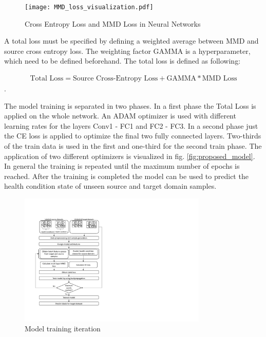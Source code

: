 \begin{figure}[H]
  \centering
  \texttt{[image: MMD\_loss\_visualization.pdf]}
  \caption {Cross Entropy Loss and MMD Loss in Neural Networks} \label{fig:MMD_Loss_and_CE_loss}
\end{figure}
 
A total loss must be specified by defining a weighted average between MMD and source cross entropy loss. The weighting factor GAMMA is a hyperparameter, which need to be defined beforehand. The total loss is defined as following:

\begin{align}
    \mbox{Total Loss} = \mbox{Source Cross-Entropy Loss} + \mbox{GAMMA} * \mbox{MMD Loss}
\end{align}.

The model training is separated in two phases. In a first phase the Total Loss is applied on the whole network. An ADAM optimizer is used with different learning rates for the layers Conv1 - FC1 and FC2 - FC3. In a second phase just the CE loss is applied to optimize the final two fully connected layers. Two-thirds of the train data is used in the first and one-third for the second train phase. The application of two different optimizers is visualized in fig. \ref{fig:proposed_model}. In general the training is repeated until the maximum number of epochs is reached. After the training is completed the model can be used to predict the health condition state of unseen source and target domain samples. 

\begin{figure}[H]
  \centering
  \includegraphics[width=0.8\textwidth]{training_process_mmd.pdf}
  \caption {Model training iteration} \label{fig:Training_Process_MMD}
\end{figure}


